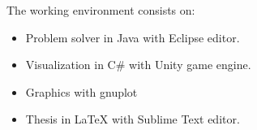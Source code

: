 \documentclass[a4paper]{article}
\begin{document}
The working environment consists on:

\begin{itemize}
	
	\item Problem solver in Java with Eclipse editor.
	\item Visualization in C\# with Unity game engine.
	\item Graphics with gnuplot
	\item Thesis in LaTeX with Sublime Text editor.

\end{itemize} 
\end{document}
